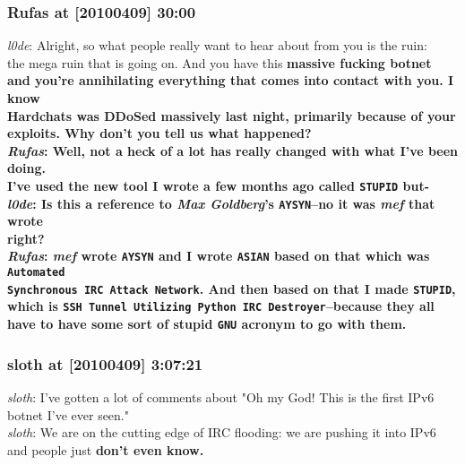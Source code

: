 \documentclass{article}
\begin{document}
\subsubsection{Rufas at [20100409] 30:00}\label{Rufas at [20100409] 30:00}
\emph{l0de}: Alright, so what people really want to hear about from you is the ruin:\\\indent the mega ruin that is going on. And you have this \bf{massive}\rm{} fucking botnet\\\indent and you're annihilating everything that comes into contact with you. I know\\\indent Hardchats was DDoSed massively last night, primarily because of your\\\indent exploits. Why don't you tell us what happened?\\
\emph{Rufas}: Well, not a heck of a lot has really changed with what I've been doing.\\\indent I've used the new tool I wrote a few months ago called {\tt STUPID} but-\\
\emph{l0de}: Is this a reference to \emph{Max Goldberg}'s {\tt AYSYN}--no it was \emph{mef} that wrote\\ right?\\
\emph{Rufas}: \emph{mef} wrote {\tt AYSYN} and I wrote {\tt ASIAN} based on that which was {\tt Automated\\\indent Synchronous IRC Attack Network}. And then based on that I made {\tt STUPID},\\\indent which is {\tt SSH Tunnel Utilizing Python IRC Destroyer}--because they all\\\indent have to have some sort of stupid {\tt GNU} acronym to go with them.
\subsubsection{sloth at [20100409] 3:07:21}\label{sloth at [20100409] 3:07:21}
\emph{sloth}: I've gotten a lot of comments about "Oh my God! This is the first IPv6\\\indent botnet I've ever seen."\\
\emph{sloth}: We are on the cutting edge of IRC flooding: we are pushing it into IPv6\\\indent and people just \bf{don't even know}\rm.
\end{document}
